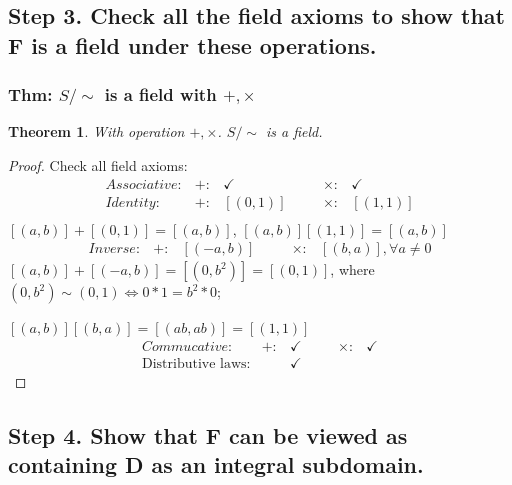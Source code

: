 \documentclass[11pt,a4paper]{article}
\newtheorem{theorem}{Theorem}
\begin{document}
\subsection{Step 3. Check all the field axioms to show that F is a field under these operations.}
\subsubsection{Thm: $S/\sim$ is a field with $+,\times$}
\begin{theorem}
    With operation $+,\times$. $S/\sim$ is a field.
\end{theorem}
\begin{proof}
Check all field axioms:
\begin{equation}
    \begin{aligned}
        Associative:& +:&\checkmark&\quad&\times:& \checkmark\\
        Identity:& +:&[(0,1)]&\quad&\times:& [(1,1)]\\
    \end{aligned}
    \nonumber
\end{equation}
$[(a,b)]+[(0,1)]=[(a,b)]$, $[(a,b)][(1,1)]=[(a,b)]$
\begin{equation}
    \begin{aligned}
        Inverse:& +:&[(-a,b)]&\quad&\times:& [(b,a)],\forall a\neq 0
    \end{aligned}
    \nonumber
\end{equation}
$[(a,b)]+[(-a,b)]=[(0,b^2)]=[(0,1)]$, where $(0,b^2)\sim (0,1) \Leftrightarrow 0*1=b^2*0$;

$[(a,b)][(b,a)]=[(ab,ab)]=[(1,1)]$
\begin{equation}
    \begin{aligned}
        Commucative:& +:&\checkmark&\quad&\times:& \checkmark\\
        \text{Distributive laws}:&&\checkmark&&&
    \end{aligned}
    \nonumber
\end{equation}
\end{proof}

\subsection{Step 4. Show that F can be viewed as containing D as an integral subdomain.}
\end{document}
